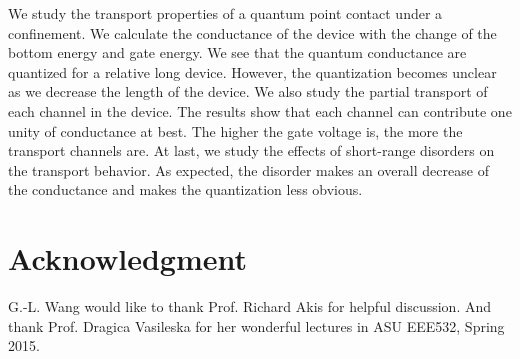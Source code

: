 \documentclass[journal]{IEEEtran}
\begin{document}
We study the transport properties of a quantum point contact under a confinement. We calculate the conductance of the
device with the change of the bottom energy and gate energy. We see that the quantum conductance are quantized for a
relative long device. However, the quantization becomes unclear as we decrease the length of the device. We also study
the partial transport of each channel in the device. The results show that each channel can contribute one unity of
conductance at best. The higher the gate voltage is, the more the transport channels are. At last, we study the effects
of short-range disorders on the transport behavior. As expected, the disorder makes an overall decrease of the
conductance and makes the quantization less obvious.

\section*{Acknowledgment}


G.-L. Wang would like to thank Prof. Richard Akis for helpful discussion. And thank Prof. Dragica Vasileska for her
wonderful lectures in ASU EEE532, Spring 2015.




\end{document}
